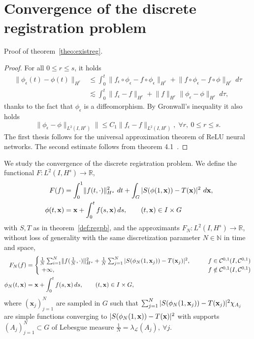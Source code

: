 \section{Convergence of the discrete registration problem}
\label{appendix:convergence}
Proof of theorem~\ref{theo:existreg}.
\begin{proof}
For all $0\leq r\leq s$, it holds
  \begin{align*}
    \lVert\phi_\epsilon(t)-\phi(t)\rVert_{H^r}&\leq \int_0^t \lVert f_\epsilon\circ\phi_\epsilon-f\circ\phi_\epsilon\rVert_{H^r}+\lVert f\circ\phi_\epsilon-f\circ \phi\rVert_{H^r}\ d\tau \\
    &\lesssim \int_{0}^t\lVert f_\epsilon-f\rVert_{H^r}+\lVert f\rVert_{H^r}\lVert\phi_\epsilon-\phi\rVert_{H^r}\ d\tau,
  \end{align*}
  thanks to the fact that $\phi_\epsilon$ is a diffeomorphism.
  By Gronwall's inequality it also holds
  \begin{equation}
    \label{eq:phif}
    \lVert \phi_\epsilon - \phi\rVert_{L^2(I, H^{r})}\rVert \leq C_1\lVert f_\epsilon - f\rVert_{L^2(I, H^{r})},  \;\forall r,\  0\leq r\leq s.
  \end{equation}
  The first thesis follows for the universal approximation theorem of ReLU neural networks. The second estimate follows from theorem 4.1~\cite{doi:10.1142/S0219530522500014}.
\end{proof}
We study the convergence of the discrete registration problem. We define the functional $F:L^2(I, H^s)\rightarrow\mathbb{R}$,
\begin{align}
  \label{eq:funccont}
   F(f) &= \int_{0}^{1}\lVert f(t, \cdot)\rVert^2_{H^s}\ dt + \int_G |S(\phi(1, \mathbf{x}))-T(\mathbf{x})|^2\ d\mathbf{x},\\\
    \phi(t, \mathbf{x})&=\mathbf{x} + \int_{0}^{t}f(s, \mathbf{x})\,ds,\qquad (t,\mathbf{x})\in I\times G
\end{align}
with $S, T$ as in theorem~\ref{def:regpb}, and the approximants $F_N:L^2(I, H^s)\rightarrow\mathbb{R}$, without loss of generality with the same discretization parameter $N\in\mathbb{N}$ in time and space,
\begin{align}
  \label{eq:funcdis}
  F_N(f) &=\begin{cases}
    \frac{1}{N}\sum_{i=1}^{N}\lVert f(\tfrac{1}{N}, \cdot)\rVert^2_{H^s} + \frac{1}{N}\sum_{j=1}^{N} |S(\phi_N(1, \mathbf{x}_j))-T(\mathbf{x}_j)|^2,\qquad &f\in \mathcal{C}^{0, 1}(I, \mathcal{C}^{0, 1})\\\
    +\infty,\qquad &f\notin \mathcal{C}^{0, 1}(I, \mathcal{C}^{0, 1})
  \end{cases}\\
  \phi_N(t, \mathbf{x})&=\mathbf{x} + \int_{0}^{t}f(s, \mathbf{x})\,ds,\qquad (t,\mathbf{x})\in I\times G,
\end{align}
where $(\mathbf{x}_j)_{j=1}^N$ are sampled in $G$ such that $\sum_{j=1}^{N} |S(\phi_N(1, \mathbf{x}_j))-T(\mathbf{x}_j)|^2\chi_{A_j}$ are simple functions converging to $|S(\phi_N(1, \mathbf{x}))-T(\mathbf{x})|^2$ with supports $(A_j)_{j=1}^{N}\subset G$ of Lebesgue measure $\tfrac{1}{N}=\lambda_{\mathcal{L}}(A_j),\ \forall j$.

